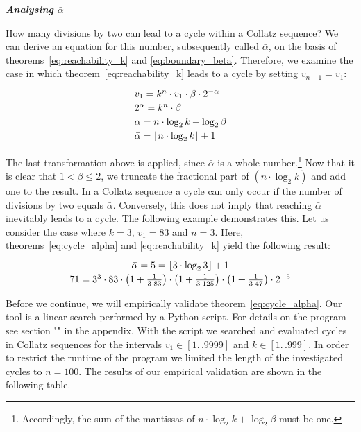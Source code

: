 \documentclass{SciPress_2015}
\renewcommand{\subsection}[1]{\textit{\textbf{#1}}}
\begin{document}
\vspace{1em}\noindent
\subsection{Analysing \boldmath$\bar\alpha$}
\par\noindent
How many divisions by two can lead to a cycle within a Collatz sequence? We can derive an equation for this number, subsequently called $\bar\alpha$, on the basis of theorems~\ref{eq:reachability_k} and \ref{eq:boundary_beta}. Therefore, we examine the case in which theorem~\ref{eq:reachability_k} leads to a cycle by setting  $v_{n+1}=v_1$:
\begin{equation}
\label{eq:cycle_alpha}
\def\arraystretch{1.2}\begin{array}{l}
	v_1=k^n\cdot v_1\cdot\beta\cdot2^{-\bar\alpha}\\
	2^{\bar\alpha}=k^n\cdot\beta\\
	\bar\alpha=n\cdot\log_2k+\log_2\beta\\
	\bar\alpha=\lfloor n\cdot\log_2k\rfloor+1
\end{array}
\end{equation}

The last transformation above is applied, since $\bar\alpha$ is a whole number.\footnote{Accordingly, the sum of the mantissas of $n\cdot\log_2k+\log_2\beta$ must be one.} Now that it is clear that $1<\beta\le2$, we truncate the fractional part of $(n\cdot \log_2k)$ and add one to the result. In a Collatz sequence a cycle can only occur if the number of divisions by two equals $\bar\alpha$. Conversely, this does not imply that reaching $\bar\alpha$ inevitably leads to a cycle. The following example demonstrates this. Let us consider the case where $k=3$, $v_1=83$ and $n=3$. Here, theorems~\ref{eq:cycle_alpha} and \ref{eq:reachability_k} yield the following result:
\[
\def\arraystretch{1.2}\begin{array}{c}
\bar\alpha=5=\lfloor3\cdot\log_23\rfloor+1\\
71=3^3\cdot83\cdot\left(1+\frac{1}{3\cdot83}\right)\cdot\left(1+\frac{1}{3\cdot125}\right)\cdot\left(1+\frac{1}{3\cdot47}\right)\cdot2^{-5}
\end{array}
\]

\par
Before we continue, we will empirically validate theorem~\ref{eq:cycle_alpha}. Our tool is a linear search performed by a Python script. For details on the program see section "" in the appendix. With the script we searched and evaluated cycles in Collatz sequences for the intervals $v_1\in[1\mathrel{{.}\,{.}}9999]$ and $k\in[1\mathrel{{.}\,{.}}999]$. In order to restrict the runtime of the program we limited the length of the investigated cycles to $n=100$. The results of our empirical validation are shown in the following table.
\end{document}
